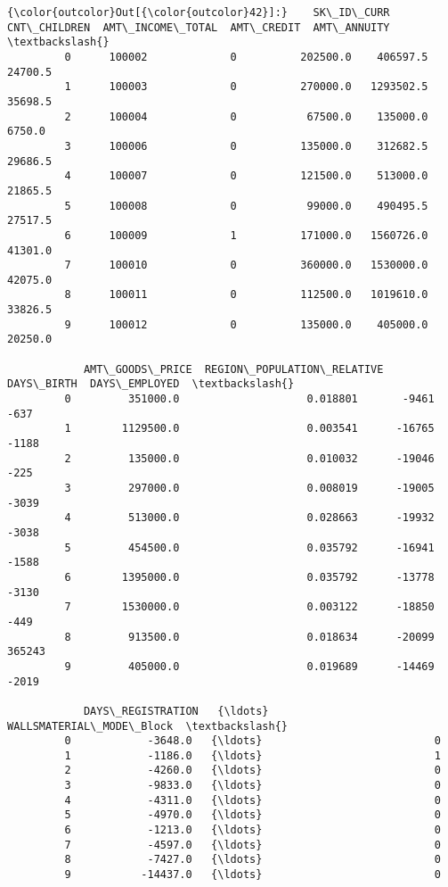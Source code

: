 \documentclass[11pt]{article}
\begin{document}
\begin{Verbatim}[commandchars=\\\{\}]
{\color{outcolor}Out[{\color{outcolor}42}]:}    SK\_ID\_CURR  CNT\_CHILDREN  AMT\_INCOME\_TOTAL  AMT\_CREDIT  AMT\_ANNUITY  \textbackslash{}
         0      100002             0          202500.0    406597.5      24700.5   
         1      100003             0          270000.0   1293502.5      35698.5   
         2      100004             0           67500.0    135000.0       6750.0   
         3      100006             0          135000.0    312682.5      29686.5   
         4      100007             0          121500.0    513000.0      21865.5   
         5      100008             0           99000.0    490495.5      27517.5   
         6      100009             1          171000.0   1560726.0      41301.0   
         7      100010             0          360000.0   1530000.0      42075.0   
         8      100011             0          112500.0   1019610.0      33826.5   
         9      100012             0          135000.0    405000.0      20250.0   
         
            AMT\_GOODS\_PRICE  REGION\_POPULATION\_RELATIVE  DAYS\_BIRTH  DAYS\_EMPLOYED  \textbackslash{}
         0         351000.0                    0.018801       -9461           -637   
         1        1129500.0                    0.003541      -16765          -1188   
         2         135000.0                    0.010032      -19046           -225   
         3         297000.0                    0.008019      -19005          -3039   
         4         513000.0                    0.028663      -19932          -3038   
         5         454500.0                    0.035792      -16941          -1588   
         6        1395000.0                    0.035792      -13778          -3130   
         7        1530000.0                    0.003122      -18850           -449   
         8         913500.0                    0.018634      -20099         365243   
         9         405000.0                    0.019689      -14469          -2019   
         
            DAYS\_REGISTRATION   {\ldots}    WALLSMATERIAL\_MODE\_Block  \textbackslash{}
         0            -3648.0   {\ldots}                           0   
         1            -1186.0   {\ldots}                           1   
         2            -4260.0   {\ldots}                           0   
         3            -9833.0   {\ldots}                           0   
         4            -4311.0   {\ldots}                           0   
         5            -4970.0   {\ldots}                           0   
         6            -1213.0   {\ldots}                           0   
         7            -4597.0   {\ldots}                           0   
         8            -7427.0   {\ldots}                           0   
         9           -14437.0   {\ldots}                           0   
         

\end{Verbatim}
\end{document}
